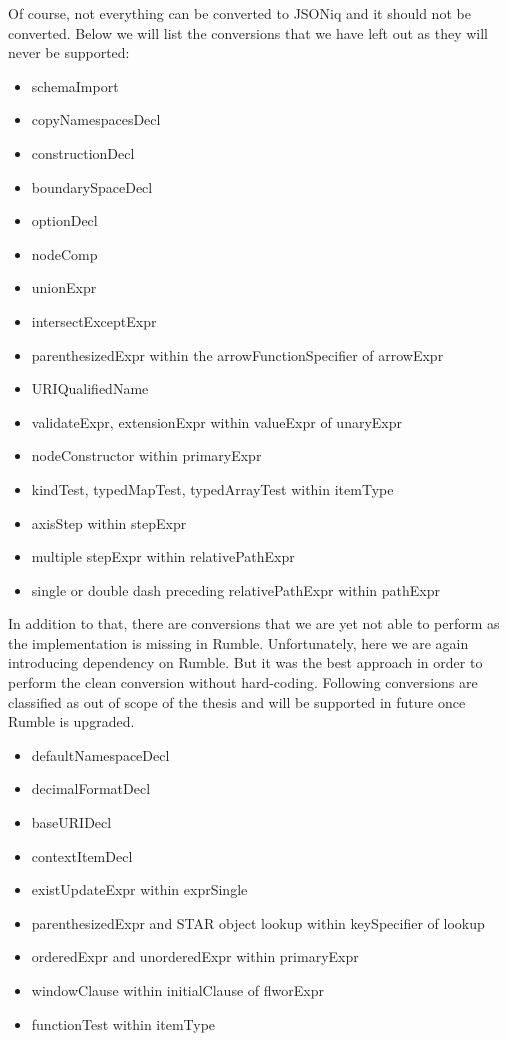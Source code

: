 Of course, not everything can be converted to JSONiq and it should not be converted. Below we will list the conversions that we have left out as they will never be supported:
\begin{itemize}
	\item schemaImport
	\item copyNamespacesDecl
	\item constructionDecl
	\item boundarySpaceDecl
	\item optionDecl
	\item nodeComp
	\item unionExpr
	\item intersectExceptExpr
	\item parenthesizedExpr within the arrowFunctionSpecifier of arrowExpr
	\item URIQualifiedName
	\item validateExpr, extensionExpr within valueExpr of unaryExpr
	\item nodeConstructor within primaryExpr
	\item kindTest, typedMapTest, typedArrayTest within itemType
	\item axisStep within stepExpr
	\item multiple stepExpr within relativePathExpr
	\item single or double dash preceding relativePathExpr within pathExpr
\end{itemize}

In addition to that, there are conversions that we are yet not able to perform as the implementation is missing in Rumble. Unfortunately, here we are again introducing dependency on Rumble. But it was the best approach in order to perform the clean conversion without hard-coding. Following conversions are classified as out of scope of the thesis and will be supported in future once Rumble is upgraded.
\begin{itemize}
	\item defaultNamespaceDecl
	\item decimalFormatDecl
	\item baseURIDecl
	\item contextItemDecl
	\item existUpdateExpr within exprSingle
	\item parenthesizedExpr and STAR object lookup within keySpecifier of lookup
	\item orderedExpr and unorderedExpr within primaryExpr
	\item windowClause within initialClause of flworExpr
	\item functionTest within itemType
\end{itemize}

